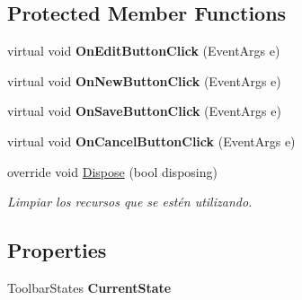 \subsection*{Protected Member Functions}
\begin{DoxyCompactItemize}
\item 
\mbox{\label{class_custom_controls_1_1_stack_view_a19b739e8edd30f174bfe870081ecfed3}} 
virtual void {\bfseries On\+Edit\+Button\+Click} (Event\+Args e)
\item 
\mbox{\label{class_custom_controls_1_1_stack_view_a11ce82dee60bdffc83f7d3ebdf10b17a}} 
virtual void {\bfseries On\+New\+Button\+Click} (Event\+Args e)
\item 
\mbox{\label{class_custom_controls_1_1_stack_view_a77a46c2d55bf40ed18bcfe90dcaf3805}} 
virtual void {\bfseries On\+Save\+Button\+Click} (Event\+Args e)
\item 
\mbox{\label{class_custom_controls_1_1_stack_view_a48997386c95398640506e1e5ada5f0dd}} 
virtual void {\bfseries On\+Cancel\+Button\+Click} (Event\+Args e)
\item 
override void \mbox{\hyperlink{class_custom_controls_1_1_stack_view_a227a09aebaaa2cc577a4bfa50cb08967}{Dispose}} (bool disposing)
\begin{DoxyCompactList}\small\item\em Limpiar los recursos que se estén utilizando. \end{DoxyCompactList}\end{DoxyCompactItemize}
\subsection*{Properties}
\begin{DoxyCompactItemize}
\item 
\mbox{\label{class_custom_controls_1_1_stack_view_a71200adab4464290b2df815e233b5bf9}} 
Toolbar\+States {\bfseries Current\+State}
\end{DoxyCompactItemize}
